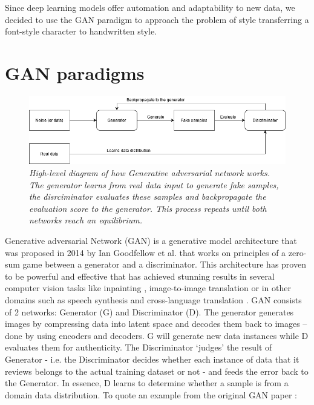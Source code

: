 \documentclass[12pt]{report}
\begin{document}
Since deep learning models offer automation and adaptability to new data, we decided to use the GAN paradigm to approach the problem of style transferring a font-style character to handwritten style.

\section{GAN paradigms}

\begin{figure}[h]
	\centering
	\includegraphics[scale=0.6]{gan-diagram}
	\caption{\textit{High-level diagram of how Generative adversarial network \cite{gan} works. The generator learns from real data input to generate fake samples, the disrciminator evaluates these samples and backpropagate the evaluation score to the generator. This process repeats until both networks reach an equilibrium.}}
	\label{fig:gan-diagram}
\end{figure}

Generative adversarial Network (GAN) is a generative model architecture that was proposed in 2014 by Ian Goodfellow et al.\cite{gan} that works on principles of a zero-sum game between a generator and a discriminator. This architecture has proven to be powerful and effective that has achieved stunning results in several computer vision tasks like inpainting \cite{image-completion}, image-to-image translation \cite{cycle-gan} or in other domains such as speech synthesis \cite{audio-gan} and cross-language translation \cite{nlp}.
GAN consists of 2 networks: Generator (G) and Discriminator (D). The generator generates images by compressing data into latent space and decodes them back to images – done by using encoders and decoders. G will generate new data instances while D evaluates them for authenticity. The Discriminator ‘judges’ the result of Generator - i.e. the Discriminator decides whether each instance of data that it reviews belongs to the actual training dataset or not - and feeds the error back to the Generator. In essence, D learns to determine whether a sample is from a domain data distribution. To quote an example from the original GAN paper \cite{gan}:
\end{document}
